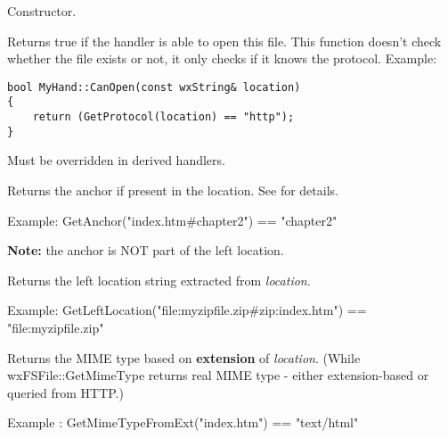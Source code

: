 Constructor.

\label{wxfilesystemhandlercanopen}


Returns true if the handler is able to open this file. This function doesn't
check whether the file exists or not, it only checks if it knows the protocol.
Example:

\begin{verbatim}
bool MyHand::CanOpen(const wxString& location) 
{
    return (GetProtocol(location) == "http");
}
\end{verbatim}

Must be overridden in derived handlers.

\label{wxfilesystemhandlergetanchor}


Returns the anchor if present in the location.
See  for details.

Example: GetAnchor("index.htm\#chapter2") == "chapter2"

{\bf Note:} the anchor is NOT part of the left location.

\label{wxfilesystemhandlergetleftlocation}


Returns the left location string extracted from {\it location}. 

Example: GetLeftLocation("file:myzipfile.zip\#zip:index.htm") == "file:myzipfile.zip"

\label{wxfilesystemhandlergetmimetypefromext}


Returns the MIME type based on {\bf extension} of {\it location}. (While wxFSFile::GetMimeType
returns real MIME type - either extension-based or queried from HTTP.)

Example : GetMimeTypeFromExt("index.htm") == "text/html"

\label{wxfilesystemhandlergetprotocol}


